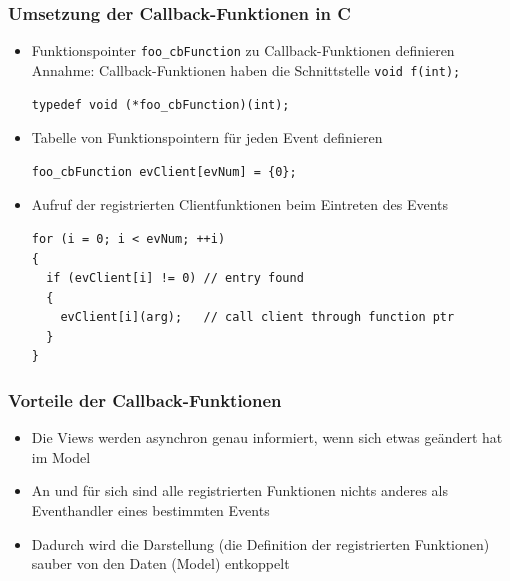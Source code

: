 \subsubsection{Umsetzung der Callback-Funktionen in C}
\begin{itemize}
	\item Funktionspointer \lstinline[style=C]{foo_cbFunction} zu Callback-Funktionen definieren\\
	Annahme: Callback-Funktionen haben die Schnittstelle \lstinline[style=C]{void f(int);}
	\begin{lstlisting}[style=C]
typedef void (*foo_cbFunction)(int);
	\end{lstlisting}

	\item Tabelle von Funktionspointern für jeden Event definieren
	\begin{lstlisting}[style=C]
foo_cbFunction evClient[evNum] = {0};
	\end{lstlisting}

	\item Aufruf der registrierten Clientfunktionen beim Eintreten des Events
	\begin{lstlisting}[style=C]
for (i = 0; i < evNum; ++i)
{
  if (evClient[i] != 0) // entry found
  {
    evClient[i](arg);   // call client through function ptr
  }
}
	\end{lstlisting}
\end{itemize}

\subsubsection{Vorteile der Callback-Funktionen}
\begin{itemize}
	\item Die Views werden asynchron genau informiert, wenn sich etwas geändert hat im Model
	\item An und für sich sind alle registrierten Funktionen nichts anderes als Eventhandler eines bestimmten Events
	\item Dadurch wird die Darstellung (die Definition der registrierten Funktionen) sauber von den Daten (Model) entkoppelt
\end{itemize}
